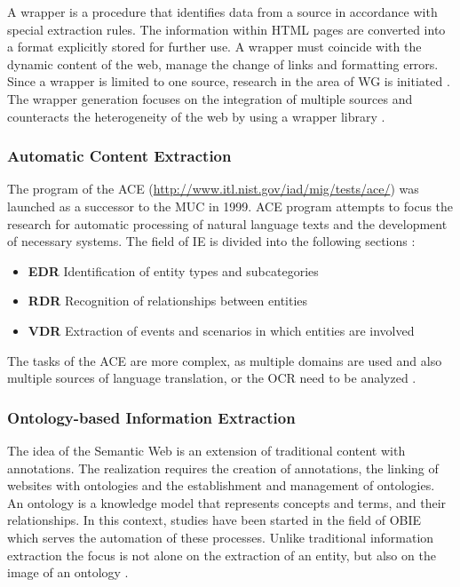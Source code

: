 A wrapper is a procedure that identifies data from a source in accordance with special extraction rules. The information within HTML pages are converted into a format explicitly stored for further use. A wrapper must coincide with the dynamic content of the web, manage the change of links and formatting errors. Since a wrapper is limited to one source, research in the area of \gls{WG} is initiated \cite{Chang:2006}\cite{Eikvil:1999}. The wrapper generation focuses on the integration of multiple sources and counteracts the heterogeneity of the web by using a wrapper library \cite{Siefkes:2007}\cite{Turmo:2006}.

\subsubsection{Automatic Content Extraction}
The program of the \gls{ACE} (\url{http://www.itl.nist.gov/iad/mig/tests/ace/})  was launched as a successor to the \gls{MUC} in 1999. \gls{ACE} program attempts to focus the research for automatic processing of natural language texts and the development of necessary systems. The field of \gls{IE} is divided into the following sections \cite{Nist:2008}\cite{Lavelli:2008}\cite{Turmo:2006}\cite{Linsmayr:2010}:

\begin{itemize}
\item \textbf{\gls{EDR}} \newline
Identification of entity types and subcategories
\item \textbf{\gls{RDR}} \newline
Recognition of relationships between entities
\item \textbf{\gls{VDR}} \newline
Extraction of events and scenarios in which entities are involved
\end{itemize}

The tasks of the \gls{ACE} are more complex, as multiple domains are used and also multiple sources of language translation, or the \gls{OCR} need to be analyzed \cite{Cunningham:2005}.

\subsubsection{Ontology-based Information Extraction}
The idea of the Semantic Web is an extension of traditional content with annotations. The realization requires the creation of annotations, the linking of websites with ontologies and the establishment and management of ontologies. An ontology is a knowledge model that represents concepts and terms, and their relationships. In this context, studies have been started in the field of \gls{OBIE} which serves the automation of these processes. Unlike traditional information extraction the focus is not alone on the extraction of an entity, but also on the image of an ontology \cite{Cunningham:2005}\cite{Maynard:2005}\cite{Weinhofer:2010}\cite{Linsmayr:2010}.

